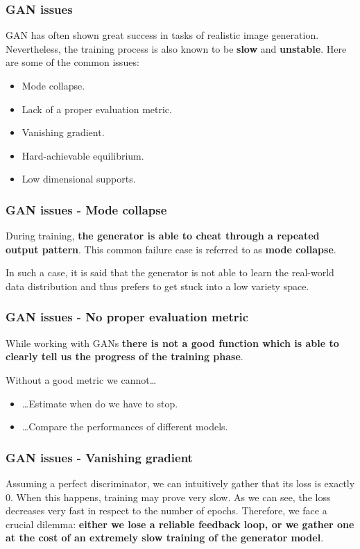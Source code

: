 \begin{frame}
    \frametitle{GAN issues}
    GAN has often shown great success in tasks of realistic image generation. Nevertheless, the training process is also known to be \textbf{slow} and \textbf{unstable}. Here are some of the common issues:
    \begin{itemize}
        \item Mode collapse.
        \item Lack of a proper evaluation metric.
        \item Vanishing gradient.
        \item Hard-achievable equilibrium.
        \item Low dimensional supports.
    \end{itemize}
\end{frame}

\begin{frame}
    \frametitle{GAN issues - Mode collapse}
    During training, \textbf{the generator is able to cheat through a repeated output pattern}. This common failure case is referred to as \textbf{mode collapse}.

    In such a case, it is said that the generator is not able to learn the real-world data distribution and thus prefers to get stuck into a low variety space.

\end{frame}

\begin{frame}
    \frametitle{GAN issues - No proper evaluation metric}
    While working with GANs \textbf{there is not a good function which is able to clearly tell us the progress of the training phase}.

    Without a good metric we cannot\dots
    \begin{itemize}
        \item \dots Estimate when do we have to stop.
        \item \dots Compare the performances of different models.
    \end{itemize}
\end{frame}

\begin{frame}
    \frametitle{GAN issues - Vanishing gradient}
    Assuming a perfect discriminator, we can intuitively gather that its loss is exactly $0$. When this happens, training may prove very slow.
    As we can see, the loss decreases very fast in respect to the number of epochs. Therefore, we face a crucial dilemma: \textbf{either we lose a reliable feedback loop, or we gather one at the cost of an extremely slow training of the generator model}.
\end{frame}

